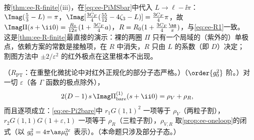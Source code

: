 \begin{example}[欧氏两圈路线]\label{ex:ee-twoloop-route}
按\cref{thm:ee-R-finite}(iii)，在\cref{eq:ee-PiMSbar}中代入 $L\to\ell-\ii\pi$：$\Imag(\frac53-L)=\pi$，$\Imag[\frac{3C_F}4(\frac{55}{12}-4\zeta_3-L)]=\frac{3C_F}4\pi$，故 $\Imag\Pi(s+\ii0)=\frac{R_0}{12\pi}(1+\frac{3C_F}4a)$，$R=R_0(1+\frac{3C_F}4\frac{\as}\pi)$，与\cref{eq:ee-R1}一致。这是\cref{thm:ee-R-finite}最直接的演示：裸的两圈 $\Pi$ 只有一个局域的（紫外的）单极点，依赖方案的常数是接触项，在 $R$ 中消失，$R$ 只由 $L$ 的系数（即 $D$）决定；割图方法中 $\pm2/\varepsilon^2$ 的红外极点在这里根本不出现。
\end{example}

\begin{proposition}\label{prop:ee-cutting-exact}
（$R_{\mathrm{PT}}$：在重整化微扰论中对红外正规化的部分子态严格。）（$\order{g_0^2}$ 阶。）对一切 $\varepsilon$（各 $\Gamma$ 函数的极点除外），
\begin{equation}\label{eq:ee-cutexact}
2(D-1)\,s\,\Imag\Pi^{(1)}_{\rm bare}(s+\ii0)=\rho_V+\rho_R ,
\end{equation}
而且逐项成立：\cref{eq:ee-Pi2bare}中 $r_1G(1,1)^2$ 一项等于 $\rho_V$（两粒子割），$r_2G(1,1)G(1+\varepsilon,1)$ 一项等于 $\rho_R$（三粒子割），$\rho_{V,R}$ 取\cref{prop:ee-oneloop}的闭式（以 $g_0^2=4\pi\as\mu_0^{2\varepsilon}$ 表示）。（本命题只涉及部分子态。）
\end{proposition}
